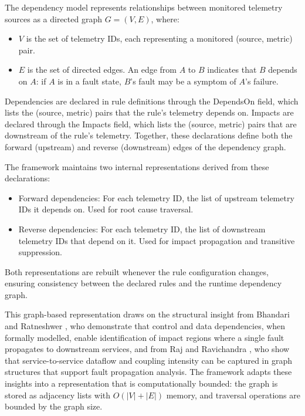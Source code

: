 The dependency model represents relationships between monitored telemetry sources as a directed graph $G = (V, E)$, where:

\begin{itemize}
\item $V$ is the set of telemetry IDs, each representing a monitored (source, metric) pair.
\item $E$ is the set of directed edges. An edge from $A$ to $B$ indicates that $B$ depends on $A$: if $A$ is in a fault state, $B$'s fault may be a symptom of $A$'s failure.
\end{itemize}

Dependencies are declared in rule definitions through the DependsOn field, which lists the (source, metric) pairs that the rule's telemetry depends on. Impacts are declared through the Impacts field, which lists the (source, metric) pairs that are downstream of the rule's telemetry. Together, these declarations define both the forward (upstream) and reverse (downstream) edges of the dependency graph.

The framework maintains two internal representations derived from these declarations:

\begin{itemize}
\item Forward dependencies: For each telemetry ID, the list of upstream telemetry IDs it depends on. Used for root cause traversal.
\item Reverse dependencies: For each telemetry ID, the list of downstream telemetry IDs that depend on it. Used for impact propagation and transitive suppression.
\end{itemize}

Both representations are rebuilt whenever the rule configuration changes, ensuring consistency between the declared rules and the runtime dependency graph.

This graph-based representation draws on the structural insight from Bhandari and Ratneshwer \cite{ref10}, who demonstrate that control and data dependencies, when formally modelled, enable identification of impact regions where a single fault propagates to downstream services, and from Raj and Ravichandra \cite{ref11}, who show that service-to-service dataflow and coupling intensity can be captured in graph structures that support fault propagation analysis. The framework adapts these insights into a representation that is computationally bounded: the graph is stored as adjacency lists with $O(|V| + |E|)$ memory, and traversal operations are bounded by the graph size.


